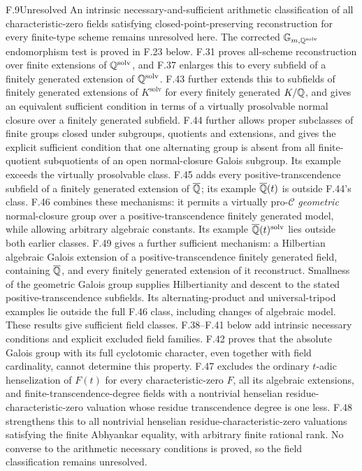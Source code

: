\begin{claim}{F.9}{Unresolved}
An intrinsic necessary-and-sufficient arithmetic classification of
all characteristic-zero fields satisfying closed-point-preserving
reconstruction for every finite-type scheme remains unresolved here.
The corrected $\mathbb G_{m,\mathbb Q^{\mathrm{solv}}}$ endomorphism
test is proved in F.23 below. F.31 proves all-scheme
reconstruction over finite extensions of $\mathbb Q^{\mathrm{solv}}$,
and F.37 enlarges this to every subfield of a finitely generated
extension of $\mathbb Q^{\mathrm{solv}}$. F.43 further extends
this to subfields of finitely generated extensions of
$K^{\mathrm{solv}}$ for every finitely generated $K/\mathbb Q$,
and gives an equivalent sufficient condition in terms of
a virtually prosolvable normal closure over a finitely
generated subfield. F.44 further allows proper subclasses of finite
groups closed under subgroups, quotients and extensions,
and gives the explicit sufficient condition that one alternating
group is absent from all finite-quotient subquotients of an open
normal-closure Galois subgroup. Its example exceeds the
virtually prosolvable class. F.45 adds every positive-transcendence
subfield of a finitely generated extension of $\overline{\mathbb Q}$;
its example $\overline{\mathbb Q}(t)$ is outside F.44's class.
F.46 combines these mechanisms: it permits a virtually pro-$\mathcal C$
\emph{geometric} normal-closure group over a positive-transcendence
finitely generated model, while allowing arbitrary algebraic constants.
Its example $\overline{\mathbb Q}(t)^{\mathrm{solv}}$ lies outside
both earlier classes. F.49 gives a further sufficient mechanism:
a Hilbertian algebraic Galois extension of a positive-transcendence
finitely generated field, containing $\overline{\mathbb Q}$, and every
finitely generated extension of it reconstruct. Smallness of the
geometric Galois group supplies Hilbertianity and descent to the
stated positive-transcendence subfields. Its alternating-product
and universal-tripod examples lie outside the full F.46 class,
including changes of algebraic model. These results give sufficient
field classes. F.38--F.41 below add intrinsic necessary
conditions and explicit excluded field families. F.42 proves that
the absolute Galois group with its full cyclotomic character,
even together with field cardinality, cannot determine this
property. F.47 excludes the ordinary $t$-adic henselization of
$F(t)$ for every characteristic-zero $F$, all its algebraic extensions,
and finite-transcendence-degree fields with a nontrivial henselian
residue-characteristic-zero valuation whose residue transcendence
degree is one less. F.48 strengthens this to all nontrivial henselian
residue-characteristic-zero valuations satisfying the finite
Abhyankar equality, with arbitrary finite rational rank.
No converse to the arithmetic necessary conditions
is proved, so the field classification remains unresolved.
\end{claim}
